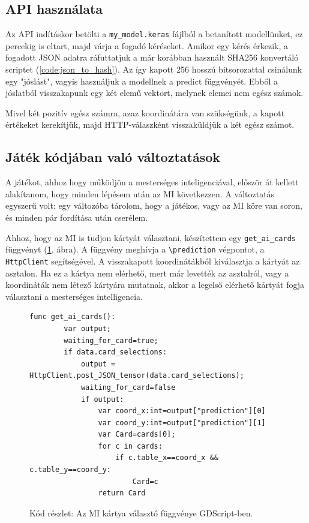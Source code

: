\subsection{API használata}

Az API indításkor betölti a \lstinline{my_model.keras} fájlból a betanított modellünket, ez percekig is eltart, majd várja a fogadó kéréseket. 
Amikor egy kérés érkezik, a fogadott JSON adatra ráfuttatjuk a már korábban használt SHA256 konvertáló scriptet (\ref{code:json_to_hash}).
Az így kapott 256 hosszú bitsorozattal csinálunk egy "jóslást", vagyis használjuk a modellnek a predict függvényét. Ebből a jóslatból visszakapunk egy két elemű vektort, melynek elemei nem egész számok.

Mivel két pozitív egész számra, azaz koordinátára van szükségünk, a kapott értékeket kerekítjük, majd HTTP-válaszként visszaküldjük a két egész számot.
\subsection{Játék kódjában való változtatások}

A játékot, ahhoz hogy működjön a mesterséges inteligenciával, először át kellett alakítanom, hogy minden lépésem után az MI következzen. A változtatás egyszerű volt: egy változóba tárolom, hogy a játékos, vagy az MI köre van soron, és minden pár fordítása után cserélem. 

Ahhoz, hogy az MI is tudjon kártyát választani, készítettem egy \lstinline{get_ai_cards} függvényt (\ref{code:get_ai_card}. ábra). A függvény meghívja a \lstinline{\prediction} végpontot, a \lstinline{HttpClient} segítségével.
A visszakapott koordinátákból kiválasztja a kártyát az asztalon. 
Ha ez a kártya nem elérhető, mert már levették az asztalról, vagy a koordináták nem létező kártyára mutatnak, akkor a legelső elérhető kártyát fogja választani a mesterséges intelligencia. 

\begin{figure}[H]
    \centering
    \begin{lstlisting}[language=GDScript]
func get_ai_cards():
        var output;
        waiting_for_card=true;
        if data.card_selections:
            output = HttpClient.post_JSON_tensor(data.card_selections);
            waiting_for_card=false
            if output:
                var coord_x:int=output["prediction"][0]
                var coord_y:int=output["prediction"][1]
                var Card=cards[0];
                for c in cards:
                    if c.table_x==coord_x && c.table_y==coord_y:
                        Card=c
                return Card
    \end{lstlisting}
    \caption{Kód részlet: Az MI kártya választó függvénye GDScript-ben.}
    \label{code:get_ai_card}
\end{figure}
